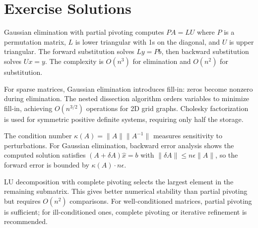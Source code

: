 \section{Exercise Solutions}

\begin{solution}
Gaussian elimination with partial pivoting computes $PA = LU$ where $P$ is a permutation matrix, $L$ is lower triangular with 1s on the diagonal, and $U$ is upper triangular. The forward substitution solves $Ly = Pb$, then backward substitution solves $Ux = y$. The complexity is $O(n^3)$ for elimination and $O(n^2)$ for substitution.
\end{solution}

\begin{solution}
For sparse matrices, Gaussian elimination introduces fill-in: zeros become nonzero during elimination. The nested dissection algorithm orders variables to minimize fill-in, achieving $O(n^{3/2})$ operations for 2D grid graphs. Cholesky factorization is used for symmetric positive definite systems, requiring only half the storage.
\end{solution}

\begin{solution}
The condition number $\kappa(A) = \|A\|\|A^{-1}\|$ measures sensitivity to perturbations. For Gaussian elimination, backward error analysis shows the computed solution satisfies $(A + \delta A)\hat{x} = b$ with $\|\delta A\| \leq n\epsilon \|A\|$, so the forward error is bounded by $\kappa(A) \cdot n\epsilon$.
\end{solution}

\begin{solution}
LU decomposition with complete pivoting selects the largest element in the remaining submatrix. This gives better numerical stability than partial pivoting but requires $O(n^2)$ comparisons. For well-conditioned matrices, partial pivoting is sufficient; for ill-conditioned ones, complete pivoting or iterative refinement is recommended.
\end{solution}
